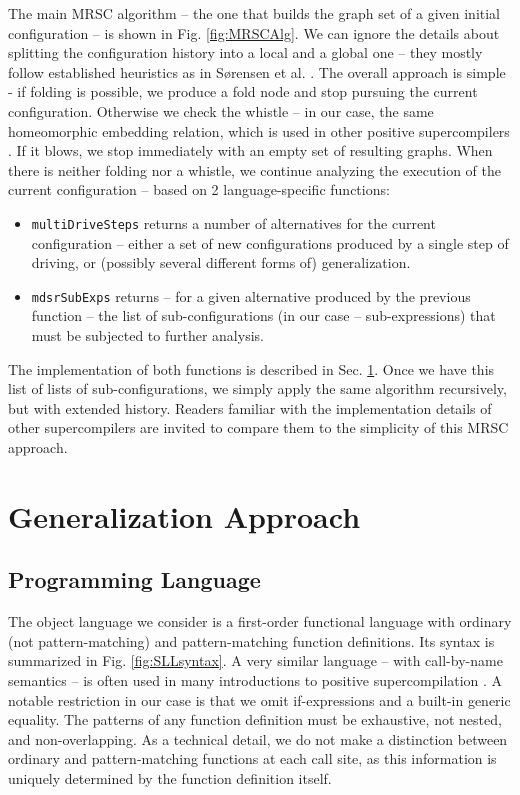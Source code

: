 \documentclass[submission,copyright,creativecommons]{eptcs}
\begin{document}
The main MRSC algorithm -- the one that builds the graph set of a given initial
configuration -- is shown in Fig. \ref{fig:MRSCAlg}.
We can ignore the details about splitting the configuration history into a local
and a global one -- they mostly follow established heuristics as in S{\o}rensen et al. 
\cite{Sorensen1994TurchinSupercompiler,sorm98b}.
The overall approach is simple - if folding is possible, we produce a fold node 
and stop pursuing the current configuration.
Otherwise we check the whistle -- in our case, the same homeomorphic embedding relation,
which is used in other positive supercompilers \cite{sorm98b}.
If it blows, we stop immediately with an empty set of resulting graphs.
When there is neither folding nor a whistle, we continue analyzing the execution of the
current configuration -- based on 2 language-specific functions:
\begin{itemize}
  \item \verb|multiDriveSteps| returns a number of alternatives for the current configuration --
    either a set of new configurations produced by a single step of driving, 
    or (possibly several different forms of) generalization.
  \item \verb|mdsrSubExps| returns -- for a given alternative produced by the previous function --
    the list of sub-configurations (in our case -- sub-expressions) that must be subjected
    to further analysis.
\end{itemize}
The implementation of both functions is described in Sec. \ref{sec:Generalize}.
Once we have this list of lists of sub-configurations, we simply apply the same
algorithm recursively, but with extended history.
Readers familiar with the implementation details of other supercompilers are
invited to compare them to the simplicity of this MRSC approach.

\section{Generalization Approach}\label{sec:Generalize}

\subsection{Programming Language}

The object language we consider is a first-order functional language with ordinary (not pattern-matching) and 
pattern-matching function definitions.
Its syntax is summarized in Fig. \ref{fig:SLLsyntax}.
A very similar language -- with call-by-name semantics -- is often used in many introductions to positive
supercompilation \cite{Sorensen1994TurchinSupercompiler,sorm98b,TMR/SCP2014}.
A notable restriction in our case is that we omit if-expressions and a built-in generic equality.
The patterns of any function definition must be exhaustive, not nested, and non-overlapping.
As a technical detail, we do not make a distinction between ordinary and pattern-matching functions
at each call site, as this information is uniquely determined by the function definition itself.
\end{document}
